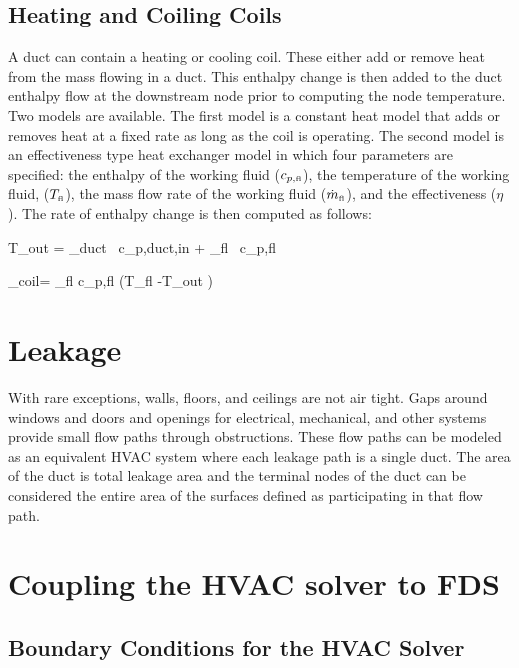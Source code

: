 \subsection{Heating and Coiling Coils}

A duct can contain a heating or cooling coil.  These either add or remove heat from the mass flowing in a duct.  This enthalpy change is then added to the duct enthalpy flow at the downstream node prior to computing the node temperature.  Two models are available.  The first model is a constant heat model that adds or removes heat at a fixed rate as long as the coil is operating.  The second model is an effectiveness type heat exchanger model in which four parameters are specified: the enthalpy of the working fluid ($c_{p,\text{\tiny fl}}$), the temperature of the working fluid, ($T_\text{\tiny fl}$), the mass flow rate of the working fluid ($\dot{m}_\text{\tiny fl}$), and the effectiveness ($\eta$).  The rate of enthalpy change is then computed as follows:

\be T_{\rm out} = 
                             {_{\rm duct} \, c_{p,{\rm duct,in}} + _{\rm fl} \, c_{p,{\rm fl}} } \ee

\be {}_{\rm coil}= _{\rm fl} c_{p,{\rm fl}} \left(T_{\rm fl} -T_{\rm out} \right) \eta \ee

\section{Leakage}

With rare exceptions, walls, floors, and ceilings are not air tight.  Gaps around windows and doors and openings for electrical, mechanical, and other systems provide small flow paths through obstructions.  These flow paths can be modeled as an equivalent HVAC system where each leakage path is a single duct.  The area of the duct is total leakage area and the terminal nodes of the duct can be considered the entire area of the surfaces defined as participating in that flow path.

\section{Coupling the HVAC solver to FDS}

\subsection{Boundary Conditions for the HVAC Solver}

